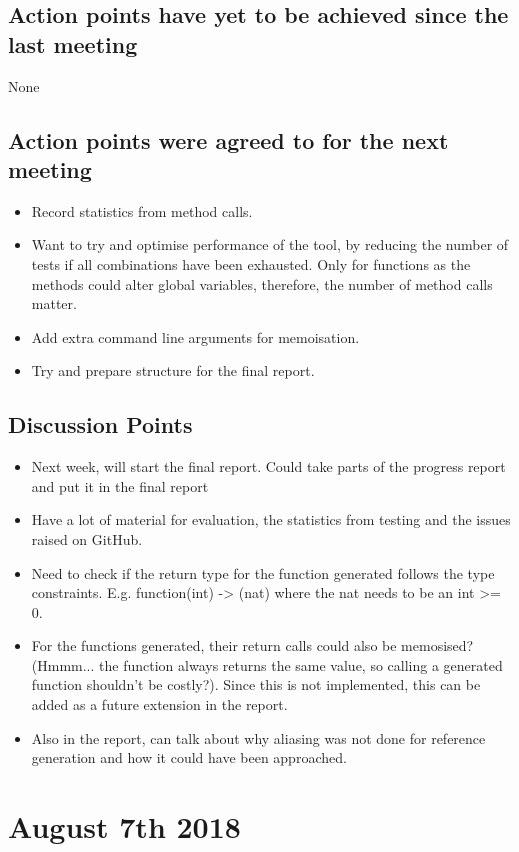 \documentclass[]{article}
\begin{document}
\subsection{Action points have yet to be achieved since the last meeting}
None
\subsection{Action points were agreed to for the next meeting}
\begin{itemize}
	\item Record statistics from method calls.
	\item Want to try and optimise performance of the tool, by reducing the number of tests if all combinations have been exhausted. Only for functions as the methods could alter global variables, therefore, the number of method calls matter.
	\item Add extra command line arguments for memoisation.
	\item Try and prepare structure for the final report.
\end{itemize}

\subsection{Discussion Points}
\begin{itemize}
	\item Next week, will start the final report. Could take parts of the progress report and put it in the final report
	\item Have a lot of material for evaluation, the statistics from testing and the issues raised on GitHub.
	\item Need to check if the return type for the function generated follows the type constraints. E.g. function(int) -> (nat) where the nat needs to be an int \textgreater= 0.
	\item For the functions generated, their return calls could also be memosised? (Hmmm... the function always returns the same value, so  calling a generated function shouldn't be costly?). Since this is not implemented, this can be added as a future extension in the report.
	\item Also in the report, can talk about why aliasing was not done for reference generation and how it could have been approached.
\end{itemize}

\section{August 7th 2018}
\end{document}
